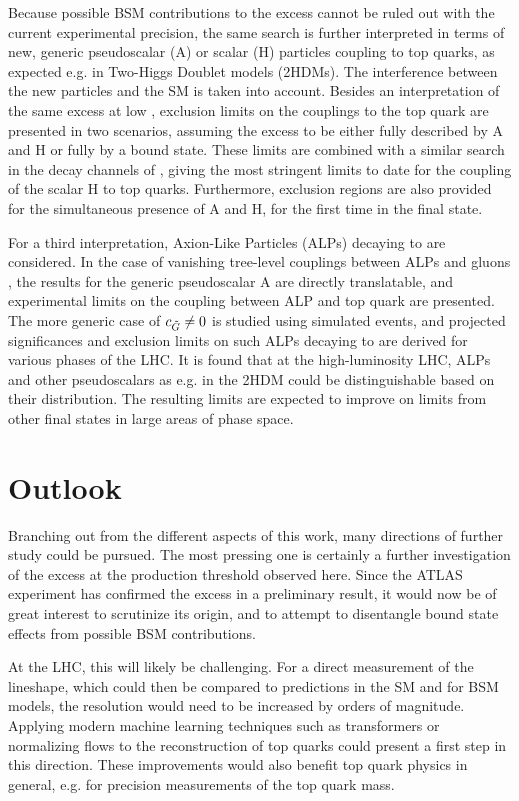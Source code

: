 Because possible BSM contributions to the excess cannot be ruled out with the current experimental precision, 
the same search is further interpreted in terms of new, generic pseudoscalar (A) or scalar (H) particles coupling to top quarks, as expected e.g. in Two-Higgs Doublet models (2HDMs). The interference between the new particles and the SM is taken into account. %
Besides an interpretation of the same excess at low \mtt, exclusion limits on the couplings to the top quark are presented in two scenarios, assuming the excess to be either fully described by A and H or fully by a \ttbar bound state. These limits are combined with a similar search in the \ljets decay channels of \ttbar, giving the most stringent limits to date for the coupling of the scalar H to top quarks. Furthermore, exclusion regions are also provided for the simultaneous presence of A and H, for the first time in the \ttbar final state.

For a third interpretation, Axion-Like Particles (ALPs) decaying to \ttbar are considered. In the case of vanishing tree-level couplings between ALPs and gluons \cG, the results for the generic pseudoscalar A are directly translatable, and experimental limits on the coupling between ALP and top quark are presented. The more generic case of $c_{\tilde{G}} \neq 0$ is studied using simulated events, and projected significances and exclusion limits on such ALPs decaying to \ttbar are derived for various phases of the LHC. It is found that at the high-luminosity LHC, ALPs and other pseudoscalars as e.g. in the 2HDM could be distinguishable based on their \mtt distribution. The resulting limits are expected to improve on limits from other final states in large areas of phase space.

\section{Outlook}

Branching out from the different aspects of this work, many directions of further study could be pursued. The most pressing one is certainly a further investigation of the excess at the \ttbar production threshold observed here. Since the ATLAS experiment has confirmed the excess in a preliminary result,
it would now be of great interest to scrutinize its origin, and to attempt to disentangle \ttbar bound state effects from possible BSM contributions.

At the LHC, this will likely be challenging. For a direct measurement of the lineshape, which could then be compared to predictions in the SM and for BSM models, the \mtt resolution would need to be increased by orders of magnitude. Applying modern machine learning techniques such as transformers or normalizing flows to the reconstruction of top quarks could present a first step in this direction. These improvements would also benefit top quark physics in general, e.g. for precision measurements of the top quark mass.

